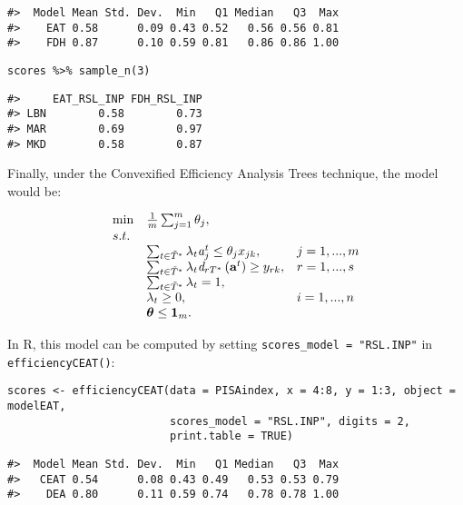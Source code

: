 \begin{verbatim}
#>  Model Mean Std. Dev.  Min   Q1 Median   Q3  Max
#>    EAT 0.58      0.09 0.43 0.52   0.56 0.56 0.81
#>    FDH 0.87      0.10 0.59 0.81   0.86 0.86 1.00
\end{verbatim}

\begin{verbatim}
scores %>% sample_n(3)
\end{verbatim}

\begin{verbatim}
#>     EAT_RSL_INP FDH_RSL_INP
#> LBN        0.58        0.73
#> MAR        0.69        0.97
#> MKD        0.58        0.87
\end{verbatim}

Finally, under the Convexified Efficiency Analysis Trees technique, the model would be:

\begin{equation} \label{(26)} 
\begin{array}{lllll} 
{} & {\min } & {\frac{1}{m} \sum_{j=1}^{m}\theta_{j},  } & {} & {} \\ 
{} & {s.t.} & {} & {} & {} \\ 
{} & {} & {\sum_{t\in \tilde{T}^{*} }^{}\lambda_{t} {\it a}_{j}^{t}  \le \theta_{j} x_{jk} ,} & {j=1,...,m} & {} \\ 
{} & {} & {\sum_{t\in \tilde{T}^{*} }^{}\lambda_{t} {\it d}_{rT^{*}} \left({\it \textbf{a}}^{t} \right) \ge y_{rk} ,} & {r=1,...,s} & {} \\ 
{} & {} & {\sum_{t\in \tilde{T}^{*} }^{}\lambda_{t}  =1,} & {} & {} \\ 
{} & {} & {\lambda _{t} \ge 0,} & {i=1,...,n} & {} \\ 
{} & {} & {{\it \boldsymbol{\theta}}\le {\bf 1}_{m}.}
\end{array} 
\end{equation}

In R, this model can be computed by setting \texttt{scores\_model\ =\ "RSL.INP"} in \texttt{efficiencyCEAT()}:

\begin{verbatim}
scores <- efficiencyCEAT(data = PISAindex, x = 4:8, y = 1:3, object = modelEAT, 
                         scores_model = "RSL.INP", digits = 2,
                         print.table = TRUE)
\end{verbatim}

\begin{verbatim}
#>  Model Mean Std. Dev.  Min   Q1 Median   Q3  Max
#>   CEAT 0.54      0.08 0.43 0.49   0.53 0.53 0.79
#>    DEA 0.80      0.11 0.59 0.74   0.78 0.78 1.00
\end{verbatim}

